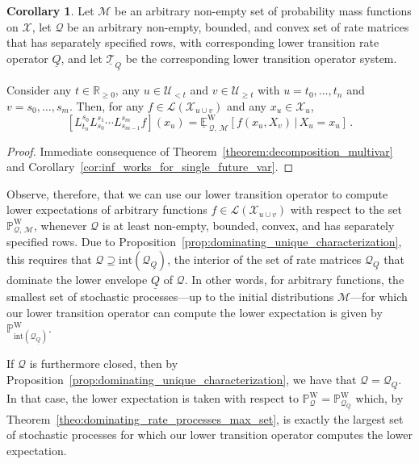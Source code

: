 \documentclass[10pt,a4paper]{paper}
\theoremstyle{definition}
\newtheorem{corollary}[theorem]{Corollary}
\newcommand{\reals}{\mathbb{R}}
\newcommand{\realsnonneg}{\reals_{\geq 0}}
\newcommand{\states}{\mathcal{X}}
\newcommand{\processes}{\mathbb{P}}
\newcommand{\wprocesses}{\processes^{\mathrm{W}}}
\newcommand{\gambles}{\mathcal{L}}
\newcommand{\rateset}{\mathcal{Q}}
\newcommand{\lrate}{\underline{Q}}
\begin{document}


\begin{corollary}\label{cor:composition_lower_trans}
Let $\mathcal{M}$ be an arbitrary non-empty set of probability mass functions on $\states$, let $\rateset$ be an arbitrary non-empty, bounded, and convex set of rate matrices that has separately specified rows, with corresponding lower transition rate operator $\lrate$, and let $\underline{\mathcal{T}}_{\lrate}$ be the corresponding lower transition operator system. 

Consider any $t\in\realsnonneg$, any $u\in\mathcal{U}_{<t}$ and $v\in\mathcal{U}_{\geq t}$ with $u=t_0,\ldots,t_n$ and $v={s_0,\ldots,s_m}$. Then, for any $f\in\gambles(\states_{u\cup v})$ and any $x_u\in\states_u$,
\begin{equation}\label{eq:composition_lower_trans}
\left[L_{t_n}^{s_0}L_{s_0}^{s_1}\cdots L_{s_{m-1}}^{s_m}f\right](x_u) = \underline{\mathbb{E}}^{\mathrm{W}}_{\,\rateset,\,\mathcal{M}}[f(x_u,X_v)\,\vert\,X_u=x_u]\,.
\end{equation}
\end{corollary}
\begin{proof}
Immediate consequence of Theorem~\ref{theorem:decomposition_multivar} and Corollary~\ref{cor:inf_works_for_single_future_var}.
\end{proof}

Observe, therefore, that we can use our lower transition operator to compute lower expectations of arbitrary functions $f\in\gambles(\states_{u\cup v})$ with respect to the set $\wprocesses_{\rateset,\,\mathcal{M}}$, whenever $\rateset$ is at least non-empty, bounded, convex, and has separately specified rows. Due to Proposition~\ref{prop:dominating_unique_characterization}, this requires that $\rateset\supseteq\text{int}(\rateset_{\lrate})$, the interior of the set of rate matrices $\rateset_{\lrate}$ that dominate the lower envelope $\lrate$ of $\rateset$. In other words, for arbitrary functions, the smallest set of stochastic processes---up to the initial distributions $\mathcal{M}$---for which our lower transition operator can compute the lower expectation is given by $\wprocesses_{\text{int}(\rateset_{\lrate})}$.

If $\rateset$ is furthermore closed, then by Proposition~\ref{prop:dominating_unique_characterization}, we have that $\rateset=\rateset_{\lrate}$. In that case, the lower expectation is taken with respect to $\wprocesses_\rateset=\wprocesses_{\rateset_{\lrate}}$ which, by Theorem~\ref{theo:dominating_rate_processes_max_set}, is exactly the largest set of stochastic processes for which our lower transition operator computes the lower expectation.
\end{document}
